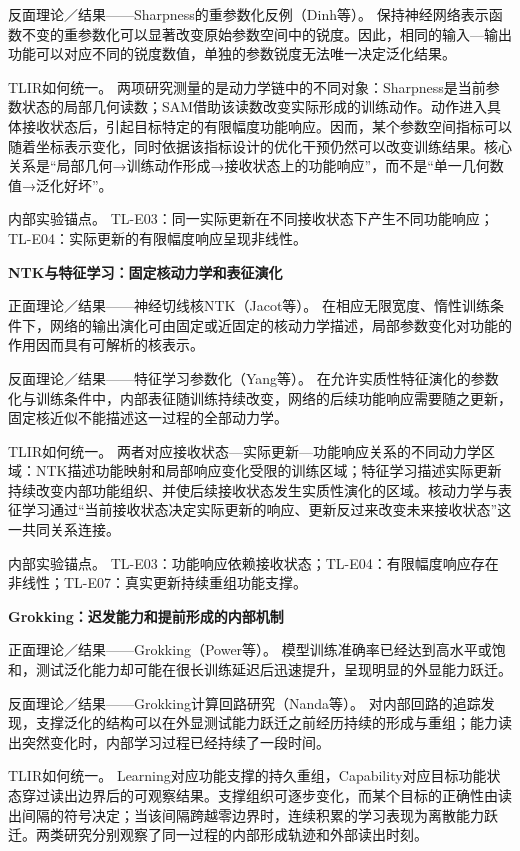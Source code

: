 反面理论／结果——Sharpness的重参数化反例（Dinh等）。 \cite{dinh2017} 保持神经网络表示函数不变的重参数化可以显著改变原始参数空间中的锐度。因此，相同的输入—输出功能可以对应不同的锐度数值，单独的参数锐度无法唯一决定泛化结果。

TLIR如何统一。 两项研究测量的是动力学链中的不同对象：Sharpness是当前参数状态的局部几何读数；SAM借助该读数改变实际形成的训练动作。动作进入具体接收状态后，引起目标特定的有限幅度功能响应。因而，某个参数空间指标可以随着坐标表示变化，同时依据该指标设计的优化干预仍然可以改变训练结果。核心关系是“局部几何→训练动作形成→接收状态上的功能响应”，而不是“单一几何数值→泛化好坏”。

内部实验锚点。 TL-E03：同一实际更新在不同接收状态下产生不同功能响应；TL-E04：实际更新的有限幅度响应呈现非线性。

\noindent\textbf{NTK与特征学习：固定核动力学和表征演化}\par

正面理论／结果——神经切线核NTK（Jacot等）。 \cite{jacot2018} 在相应无限宽度、惰性训练条件下，网络的输出演化可由固定或近固定的核动力学描述，局部参数变化对功能的作用因而具有可解析的核表示。

反面理论／结果——特征学习参数化（Yang等）。 \cite{yang2021} 在允许实质性特征演化的参数化与训练条件中，内部表征随训练持续改变，网络的后续功能响应需要随之更新，固定核近似不能描述这一过程的全部动力学。

TLIR如何统一。 两者对应接收状态—实际更新—功能响应关系的不同动力学区域：NTK描述功能映射和局部响应变化受限的训练区域；特征学习描述实际更新持续改变内部功能组织、并使后续接收状态发生实质性演化的区域。核动力学与表征学习通过“当前接收状态决定实际更新的响应、更新反过来改变未来接收状态”这一共同关系连接。

内部实验锚点。 TL-E03：功能响应依赖接收状态；TL-E04：有限幅度响应存在非线性；TL-E07：真实更新持续重组功能支撑。

\noindent\textbf{Grokking：迟发能力和提前形成的内部机制}\par

正面理论／结果——Grokking（Power等）。 \cite{power2022} 模型训练准确率已经达到高水平或饱和，测试泛化能力却可能在很长训练延迟后迅速提升，呈现明显的外显能力跃迁。

反面理论／结果——Grokking计算回路研究（Nanda等）。 \cite{nanda2023} 对内部回路的追踪发现，支撑泛化的结构可以在外显测试能力跃迁之前经历持续的形成与重组；能力读出突然变化时，内部学习过程已经持续了一段时间。

TLIR如何统一。 Learning对应功能支撑的持久重组，Capability对应目标功能状态穿过读出边界后的可观察结果。支撑组织可逐步变化，而某个目标的正确性由读出间隔的符号决定；当该间隔跨越零边界时，连续积累的学习表现为离散能力跃迁。两类研究分别观察了同一过程的内部形成轨迹和外部读出时刻。


